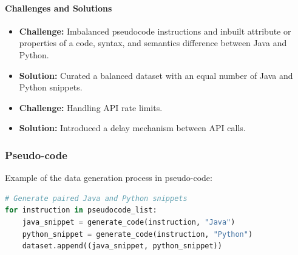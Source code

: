\documentclass{dhbenelux}
\begin{document}
\paragraph{Challenges and Solutions}
\begin{itemize}
    \item \textbf{Challenge:} Imbalanced pseudocode instructions and inbuilt attribute or properties of a code, syntax, and semantics difference between Java and Python.
    \item \textbf{Solution:} Curated a balanced dataset with an equal number of Java and Python snippets.
    \item \textbf{Challenge:} Handling API rate limits.
    \item \textbf{Solution:} Introduced a delay mechanism between API calls.
\end{itemize}

\subsubsection{Pseudo-code}

\noindent Example of the data generation process in pseudo-code:
\begin{lstlisting}[language=Python, caption={Pseudocode for Dataset Preparation}]
# Generate paired Java and Python snippets
for instruction in pseudocode_list:
    java_snippet = generate_code(instruction, "Java")
    python_snippet = generate_code(instruction, "Python")
    dataset.append((java_snippet, python_snippet))
\end{lstlisting}
\end{document}
